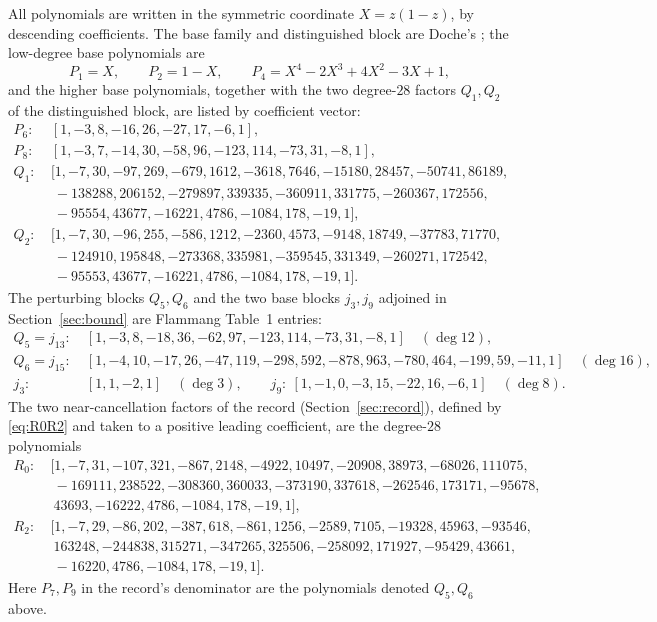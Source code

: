 \documentclass[11pt,reqno]{amsart}
\theoremstyle{plain}
\theoremstyle{definition}
\begin{document}
All polynomials are written in the symmetric coordinate $X=z(1-z)$, by descending
coefficients. The base family and distinguished block are Doche's \citep{Doc01b}; the
low-degree base polynomials are
\[
  P_1=X,\qquad P_2=1-X,\qquad P_4=X^4-2X^3+4X^2-3X+1,
\]
and the higher base polynomials, together with the two degree-$28$ factors $Q_1,Q_2$
of the distinguished block, are listed by coefficient vector:
{\small
\begin{align*}
P_6:&\ [1,-3,8,-16,26,-27,17,-6,1],\\
P_8:&\ [1,-3,7,-14,30,-58,96,-123,114,-73,31,-8,1],\\
Q_1:&\ [1,-7,30,-97,269,-679,1612,-3618,7646,-15180,28457,-50741,86189,\\
   &\ \ -138288,206152,-279897,339335,-360911,331775,-260367,172556,\\
   &\ \ -95554,43677,-16221,4786,-1084,178,-19,1],\\
Q_2:&\ [1,-7,30,-96,255,-586,1212,-2360,4573,-9148,18749,-37783,71770,\\
   &\ \ -124910,195848,-273368,335981,-359545,331349,-260271,172542,\\
   &\ \ -95553,43677,-16221,4786,-1084,178,-19,1].
\end{align*}}
The perturbing blocks $Q_5,Q_6$ and the two base blocks $j_3,j_9$ adjoined in
Section~\ref{sec:bound} are Flammang \citep{F18} Table~1 entries:
{\small
\begin{align*}
Q_5=j_{13}:&\ [1,-3,8,-18,36,-62,97,-123,114,-73,31,-8,1]\quad(\deg 12),\\
Q_6=j_{15}:&\ [1,-4,10,-17,26,-47,119,-298,592,-878,963,-780,464,-199,59,-11,1]\quad(\deg 16),\\
j_3:&\ [1,1,-2,1]\quad(\deg 3),\qquad
j_9:\ [1,-1,0,-3,15,-22,16,-6,1]\quad(\deg 8).
\end{align*}}
The two near-cancellation factors of the \citet{Gri26} record
(Section~\ref{sec:record}), defined by \eqref{eq:R0R2} and taken to a positive
leading coefficient, are the degree-$28$ polynomials
{\small
\begin{align*}
R_0:&\ [1,-7,31,-107,321,-867,2148,-4922,10497,-20908,38973,-68026,111075,\\
   &\ \ -169111,238522,-308360,360033,-373190,337618,-262546,173171,-95678,\\
   &\ \ 43693,-16222,4786,-1084,178,-19,1],\\
R_2:&\ [1,-7,29,-86,202,-387,618,-861,1256,-2589,7105,-19328,45963,-93546,\\
   &\ \ 163248,-244838,315271,-347265,325506,-258092,171927,-95429,43661,\\
   &\ \ -16220,4786,-1084,178,-19,1].
\end{align*}}
Here $P_7,P_9$ in the record's denominator are the polynomials denoted $Q_5,Q_6$
above.



\end{document}
